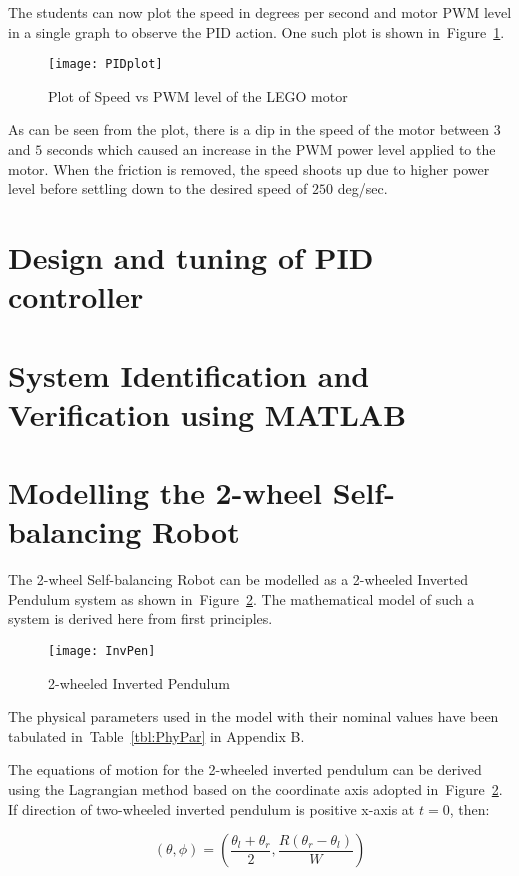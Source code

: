 \documentclass[paper=a4, fontsize=11pt]{scrartcl}
\numberwithin{equation}{section}        %
\numberwithin{figure}{section}          %
\numberwithin{table}{section}           %
\begin{document}
The students can now plot the speed in degrees per second and motor PWM level in a single graph to observe the PID action. One such plot is shown in~Figure~\ref{fig:PIDplot}.

\begin{figure}[!hbp]
	\texttt{[image: PIDplot]}
	\caption{Plot of Speed vs PWM level of the LEGO motor}
	\label{fig:PIDplot}
\end{figure}

As can be seen from the plot, there is a dip in the speed of the motor between $3$ and $5$ seconds which caused an increase in the PWM power level applied to the motor. When the friction is removed, the speed shoots up due to higher power level before settling down to the desired speed of $250$ deg/sec.

\section{Design and tuning of PID controller}

\section{System Identification and Verification using MATLAB}

\section{Modelling the 2-wheel Self-balancing Robot}
The 2-wheel Self-balancing Robot can be modelled as a 2-wheeled Inverted Pendulum system as shown in~Figure~\ref{fig:InvPen}. The mathematical model of such a system is derived here from first principles. 
\begin{figure}[!hbp]
	\texttt{[image: InvPen]}
	\caption{2-wheeled Inverted Pendulum}
	\label{fig:InvPen}
\end{figure}
The physical parameters used in the model with their nominal values have been tabulated in~Table~\ref{tbl:PhyPar} in Appendix B.

The equations of motion for the 2-wheeled inverted pendulum can be derived using the Lagrangian method based on the coordinate axis adopted in~Figure~\ref{fig:InvPen}. If direction of two-wheeled inverted pendulum is positive x-axis at $t=0$, then:

\begin{equation}
(\theta,\phi) = (\frac{\theta{}_{l}+\theta{}_{r}}{2},\frac{R(\theta{}_{r}-\theta{}_{l})}{W})
\end{equation}
\end{document}
